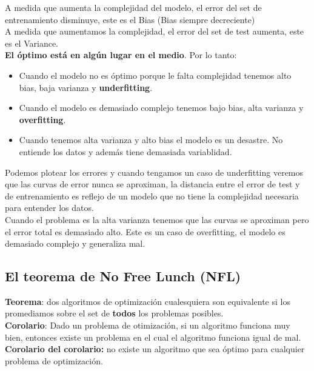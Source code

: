 \documentclass[titlepage,a4paper]{article}
\begin{document}
A medida que aumenta la complejidad del modelo, el error del set de entrenamiento disminuye, este es el Bias (Bias siempre decreciente) \\

A medida que aumentamos la complejidad, el error del set de test aumenta, este es el Variance.  \\

\textbf{El óptimo está en algún lugar en el medio}. 
Por lo tanto: 
\begin{itemize}
\item Cuando el modelo no es óptimo porque le falta complejidad tenemos alto bias, baja varianza y \textbf{underfitting}. 
\item Cuando el modelo es demasiado complejo tenemos bajo bias, alta varianza y \textbf{overfitting}.
\item Cuando tenemos alta varianza y alto bias el modelo es un desastre. No entiende los datos y además tiene demasiada variablidad. 
\end{itemize} 

Podemos plotear los errores y cuando tengamos un caso de underfitting veremos que las curvas de error nunca se aproximan, la distancia entre el error de test y de entrenamiento es reflejo de un modelo que no tiene la complejidad necesaria para entender los datos. \\

Cuando el problema es la alta varianza tenemos que las curvas se aproximan pero el error total es demasiado alto.  Este es un caso de overfitting, el modelo es demasiado complejo y generaliza mal.  \\

\subsection*{El teorema de No Free Lunch (NFL)} 

\textbf{Teorema}:  dos algoritmos de optimización cualesquiera son equivalente si los promediamos sobre el set de \textbf{todos} los problemas posibles. \\

\textbf{Corolario}: Dado un problema de otimización, si un algoritmo funciona muy bien, entonces existe un problema en el cual el algoritmo funciona igual de mal. \\

\textbf{Corolario del corolario: } no existe un algoritmo que sea óptimo para cualquier problema de optimización. \\
\end{document}
